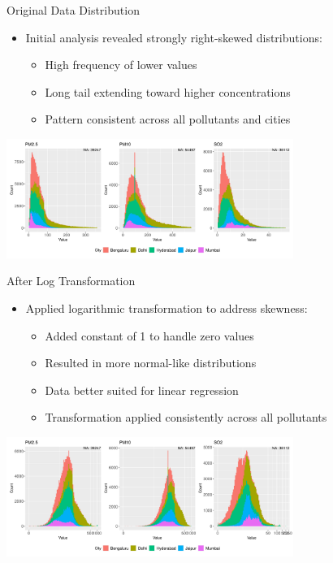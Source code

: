 \documentclass[svgnames, 10pt]{beamer}
\begin{document}
\begin{frame}{Original Data Distribution}
    \begin{itemize}
        \item Initial analysis revealed strongly right-skewed distributions:
            \begin{itemize}
                \item High frequency of lower values
                \item Long tail extending toward higher concentrations
                \item Pattern consistent across all pollutants and cities
            \end{itemize}
    \end{itemize}
    \vspace{1em}
    \begin{center}
        \includegraphics[width=0.7\textwidth]{assets/skewness.png}
    \end{center}
    \vfill
\end{frame}

\begin{frame}{After Log Transformation}
    \begin{itemize}
        \item Applied logarithmic transformation to address skewness:
            \begin{itemize}
                \item Added constant of 1 to handle zero values
                \item Resulted in more normal-like distributions
                \item Data better suited for linear regression
                \item Transformation applied consistently across all pollutants
            \end{itemize}
    \end{itemize}
    \vspace{1em}
    \begin{center}
        \includegraphics[width=0.7\textwidth]{assets/log-scaled-pollutants.png}
    \end{center}
    \vfill
\end{frame}
\end{document}
